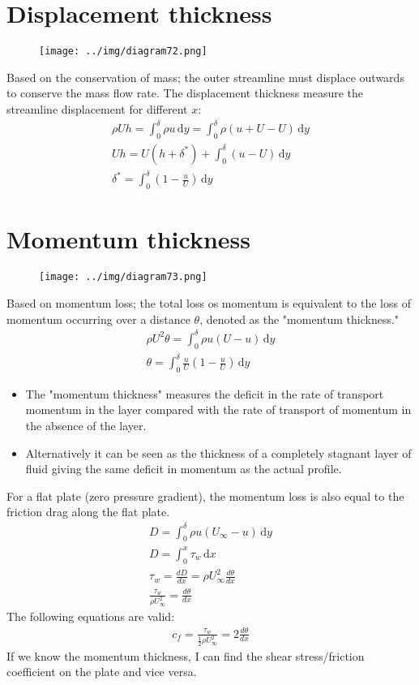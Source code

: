 \documentclass[class=report, crop=false, 12pt,a4paper]{standalone}
\begin{document}
\section{Displacement thickness}
\begin{figure}[H]
  \centering
  \texttt{[image: ../img/diagram72.png]}
\end{figure}
Based on the conservation of mass; the outer streamline must displace outwards to conserve the mass flow rate. The displacement thickness measure the streamline displacement for different $x$:
\begin{gather}
  \rho U h = \int_{0}^{\delta} \rho u \,\mathrm{d}y = \int_{0}^{\delta} \rho \left(u + U - U\right) \,\mathrm{d}y\\
  Uh = U(h + \delta^*) + \int_{0}^{\delta} \left(u - U\right) \,\mathrm{d}y\\
  \delta^* = \int_{0}^{\delta} \left(1 - \frac{u}{U}\right) \,\mathrm{d}y
\end{gather}
\section{Momentum thickness}
\begin{figure}[H]
  \centering
  \texttt{[image: ../img/diagram73.png]}
\end{figure}
Based on momentum loss; the total loss os momentum is equivalent to the loss of momentum occurring over a distance $\theta$, denoted as the "momentum thickness."
\begin{gather}
  \rho U^2 \theta = \int_{0}^{\delta} \rho u (U - u) \,\mathrm{d}y\\
  \theta = \int_{0}^{\delta} \frac{u}{U} \left(1 - \frac{u}{U}\right) \,\mathrm{d}y
\end{gather}
\begin{itemize}
  \item The "momentum thickness" measures the deficit in the rate of transport momentum in the layer compared with the rate of transport of momentum in the absence of the layer.
  \item Alternatively it can be seen as the thickness of a completely stagnant layer of fluid giving the same deficit in momentum as the actual profile.
\end{itemize}
For a flat plate (zero pressure gradient), the momentum loss is also equal to the friction drag along the flat plate. 
\begin{gather}
  D = \int_{0}^{\delta} \rho u (U_\infty - u) \,\mathrm{d}y\\
  D = \int_{0}^{x} \tau_w \,\mathrm{d}x\\
  \tau_w = \frac{dD}{dx} = \rho U_\infty^2 \frac{d\theta}{dx}\\
  \frac{\tau_w}{\rho U_\infty^2} = \frac{d\theta}{dx}
\end{gather}
The following equations are valid:
\begin{align}
  c_f = \frac{\tau_w}{\frac{1}{2}\rho U_\infty^2} = 2\frac{d\theta}{dx}
\end{align}
If we know the momentum thickness, I can find the shear stress/friction coefficient on the plate and vice versa.
\end{document}
